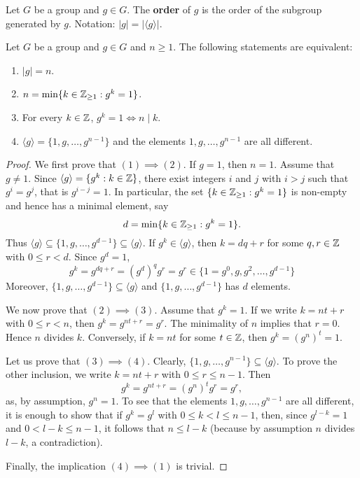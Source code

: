 \begin{definition}
        Let $G$ be a group and $g\in G$. The \textbf{order} of $g$
        is the order of the subgroup generated by $g$. Notation:
        $|g|=|\langle g\rangle|$.
\end{definition}


\begin{theorem}
        Let $G$ be a group and $g\in G$ and $n\geq1$. 
        The following statements are equivalent:
        \begin{enumerate}
                \item $|g|=n$.
                \item $n=\min\{k\in\mathbb{Z}_{\geq1}:g^k=1\}$.
                \item For every $k\in\mathbb{Z}$, $g^k=1\Longleftrightarrow n\mid k$.
                \item $\langle g\rangle=\{1,g,\dots,g^{n-1}\}$ and 
                the elements $1,g,\dots,g^{n-1}$ are all different.
        \end{enumerate}
\end{theorem}


\begin{proof}
        We first prove that $(1)\implies(2)$.
        If $g=1$, then $n=1$. Assume that $g\ne1$. Since $\langle g\rangle=\{g^k:k\in\mathbb{Z}\}$,
        there exist integers $i$ and $j$ with $i>j$ such that $g^i=g^j$, that is $g^{i-j}=1$. In particular,
        the set $\{k\in\mathbb{Z}_{\geq1}:g^k=1\}$ is non-empty and hence has a minimal element, say 
        \[
        d=\min\{k\in\mathbb{Z}_{\geq1}:g^k=1\}.
        \]
        Thus $\langle g\rangle\subseteq\{1,g,\dots,g^{d-1}\}\subseteq\langle g\rangle$. 
        If $g^k\in\langle g\rangle$, then $k=dq+r$ for some $q,r\in\mathbb{Z}$ with $0\leq r<d$. Since $g^d=1$,
        \[
        g^k=g^{dq+r}=(g^d)^qg^r=g^r\in\{1=g^0,g,g^2,\dots,g^{d-1}\}
        \]
        Moreover, $\{1,g,\dots,g^{d-1}\}\subseteq \langle g\rangle$ and 
        $\{1,g,\dots,g^{d-1}\}$ has $d$ elements.

        We now prove that $(2)\implies(3)$. Assume that $g^k=1$. If 
        we write $k=nt+r$ with $0\leq r<n$, then $g^k=g^{nt+r}=g^r$. The minimality of $n$ 
        implies that $r=0$. Hence $n$ divides $k$.
        Conversely, if $k=nt$ for some $t\in\mathbb{Z}$, then $g^k=(g^n)^t=1$.

        Let us prove that $(3)\implies(4)$. Clearly, 
        $\{1,g,\dots,g^{n-1}\}\subseteq\langle g\rangle$. To prove the other 
        inclusion, we write $k=nt+r$ with $0\leq r\leq n-1$. Then 
        \[
                g^k=g^{nt+r}=(g^n)^tg^r=g^r, 
        \]
        as, by assumption, $g^n=1$. To see that the elements 
        $1,g,\dots,g^{n-1}$ are all different, it is enough to show that if $g^k=g^l$ with $0\leq
        k<l\leq n-1$, then, since $g^{l-k}=1$ and $0<l-k\leq n-1$, it follows that 
        $n\leq l-k$ (because by assumption $n$ divides $l-k$, a contradiction).

        Finally, the implication $(4)\implies(1)$ is trivial.
\end{proof}

